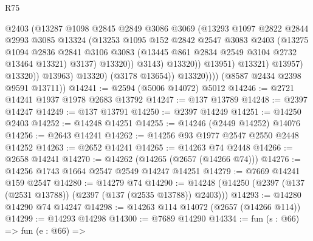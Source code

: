 \begin{lexlean}{R75}
\begin{coremodule}
                                  @2403
                                  (@13287
                                    @1098
                                    @2845
                                    @2849
                                    @3086
                                    @3069
                                    (@13293
                                      @1097
                                      @2822
                                      @2844
                                      @2993
                                      @3085
                                      @13324
                                      (@13253
                                        @1095
                                        @152
                                        @2842
                                        @2547
                                        @3083
                                        @2403
                                        (@13275
                                          @1094
                                          @2836
                                          @2841
                                          @3106
                                          @3083
                                          (@13445 @861 @2834 @2549 @3104 @2732 @13464 @13321)
                                          @3137)
                                        @13320))
                                    @3143)
                                  @13320))
                              @13951)
                            @13321)
                          @13957)
                        @13320))
                    @13963)
                  @13320)
                (@3178 @13654))
              @13320))))
      (@8587 @2434 @2398 @9591 @13711))
@14241 := @2594 (@5006 @14072) @5012
@14246 := @2721 @14241 @1937 @1978 @2683 @13792
@14247 := @137 @13789
@14248 := @2397 @14247
@14249 := @137 @13791
@14250 := @2397 @14249
@14251 := @14250 @2403
@14252 := @14248 @14251
@14255 := @14246 (@2449 @14252) @14076
@14256 := @2643 @14241
@14262 := @14256 @93 @1977 @2547 @2550 @2448 @14252
@14263 := @2652 @14241
@14265 := @14263 @74 @2448
@14266 := @2658 @14241
@14270 := @14262 (@14265 (@2657 (@14266 @74)))
@14276 := @14256 @1743 @1664 @2547 @2549 @14247 @14251
@14279 := @7669 @14241 @159 @2547
@14280 := @14279 @74
@14290 := @14248 (@14250 (@2397 (@137 (@2531 @13788)) (@2397 (@137 (@2535 @13788)) @2403)))
@14293 := @14280 @14290 @74 @14247
@14298 := @14263 @114 @14072 (@2657 (@14266 @114))
@14299 := @14293 @14298
@14300 := @7689 @14290
@14334 := fun (s : @66) =>
  fun (e : @66) =>

\end{coremodule}
\end{lexlean}

